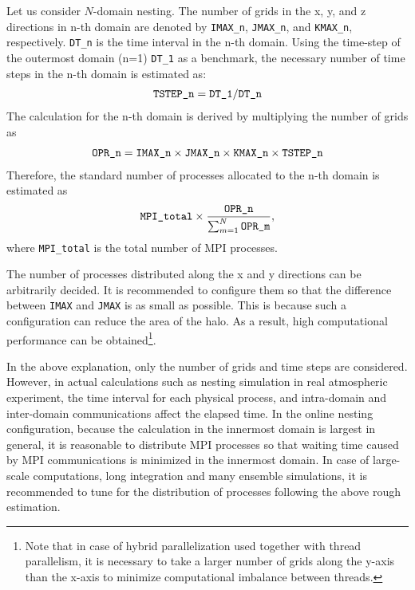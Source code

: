 Let us consider $N$-domain nesting. The number of grids in the x, y, and z directions in n-th domain are denoted by
\verb|IMAX_n|, \verb|JMAX_n|, and \verb|KMAX_n|, respectively.
\verb|DT_n| is the time interval  in the n-th domain.
Using the time-step of the outermost domain (n=1) \verb|DT_1| as a benchmark,
the necessary number of time steps in the n-th domain is estimated as:
\begin{eqnarray}
 \verb|TSTEP_n| = \verb|DT_1| / \verb|DT_n|  \nonumber
\end{eqnarray}
The calculation for the n-th domain is derived by multiplying the number of grids as
\begin{eqnarray}
 \verb|OPR_n| = \verb|IMAX_n| \times \verb|JMAX_n| \times \verb|KMAX_n| \times \verb|TSTEP_n| \nonumber
\end{eqnarray}
Therefore, the standard number of processes allocated to the n-th domain is estimated as
\begin{eqnarray}
 \verb|MPI_total| \times \frac{ \texttt{OPR\_n} }{ \sum_{m=1}^N \texttt{OPR\_m} },
\end{eqnarray}
where \verb|MPI_total| is the total number of MPI processes.

The number of processes distributed along the x and y directions  can be arbitrarily decided.
It is recommended to configure them so that the difference between \verb|IMAX| and \verb|JMAX| is as small as possible. This is because such a configuration can reduce the area of the halo. As a result, high computational performance can be obtained\footnote{Note that in case of hybrid parallelization used together with thread parallelism, it is necessary to take a larger number of grids along the y-axis than the x-axis to minimize computational imbalance between threads.}.


In the above explanation, only the number of grids and time steps are considered. However, in actual calculations such as nesting simulation in real atmospheric experiment, the time interval for each physical process, and intra-domain and inter-domain communications affect the elapsed time. In the online nesting configuration, because the calculation in the innermost domain is largest in general, it is reasonable to distribute MPI processes so that waiting time caused by MPI communications is minimized in the innermost domain.  In case of large-scale computations, long integration and many ensemble simulations, it is recommended to tune for the distribution of processes following the above rough estimation.

